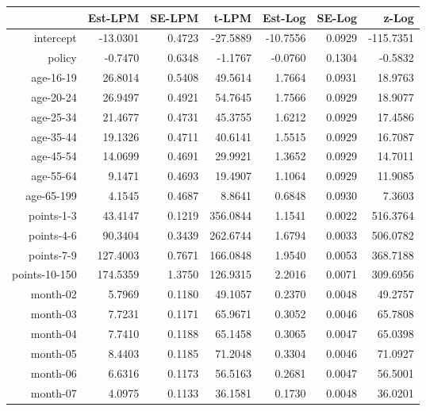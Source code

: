 \documentclass[10pt]{article}
\begin{document}
\clearpage
\pagebreak




\begin{table}[ht]
\centering
\begin{tabular}{rrrrrrr}
  \hline
 & Est-LPM & SE-LPM & t-LPM & Est-Log & SE-Log & z-Log \\ 
  \hline
intercept & -13.0301 & 0.4723 & -27.5889 & -10.7556 & 0.0929 & -115.7351 \\ 
  policy & -0.7470 & 0.6348 & -1.1767 & -0.0760 & 0.1304 & -0.5832 \\ 
  age-16-19 & 26.8014 & 0.5408 & 49.5614 & 1.7664 & 0.0931 & 18.9763 \\ 
  age-20-24 & 26.9497 & 0.4921 & 54.7645 & 1.7566 & 0.0929 & 18.9077 \\ 
  age-25-34 & 21.4677 & 0.4731 & 45.3755 & 1.6212 & 0.0929 & 17.4586 \\ 
  age-35-44 & 19.1326 & 0.4711 & 40.6141 & 1.5515 & 0.0929 & 16.7087 \\ 
  age-45-54 & 14.0699 & 0.4691 & 29.9921 & 1.3652 & 0.0929 & 14.7011 \\ 
  age-55-64 & 9.1471 & 0.4693 & 19.4907 & 1.1064 & 0.0929 & 11.9085 \\ 
  age-65-199 & 4.1545 & 0.4687 & 8.8641 & 0.6848 & 0.0930 & 7.3603 \\ 
  points-1-3 & 43.4147 & 0.1219 & 356.0844 & 1.1541 & 0.0022 & 516.3764 \\ 
  points-4-6 & 90.3404 & 0.3439 & 262.6744 & 1.6794 & 0.0033 & 506.0782 \\ 
  points-7-9 & 127.4003 & 0.7671 & 166.0848 & 1.9540 & 0.0053 & 368.7188 \\ 
  points-10-150 & 174.5359 & 1.3750 & 126.9315 & 2.2016 & 0.0071 & 309.6956 \\ 
  month-02 & 5.7969 & 0.1180 & 49.1057 & 0.2370 & 0.0048 & 49.2757 \\ 
  month-03 & 7.7231 & 0.1171 & 65.9671 & 0.3052 & 0.0046 & 65.7808 \\ 
  month-04 & 7.7410 & 0.1188 & 65.1458 & 0.3065 & 0.0047 & 65.0398 \\ 
  month-05 & 8.4403 & 0.1185 & 71.2048 & 0.3304 & 0.0046 & 71.0927 \\ 
  month-06 & 6.6316 & 0.1173 & 56.5163 & 0.2681 & 0.0047 & 56.5001 \\ 
  month-07 & 4.0975 & 0.1133 & 36.1581 & 0.1730 & 0.0048 & 36.0201 \\ 

\end{tabular}
\end{table}
\end{document}
